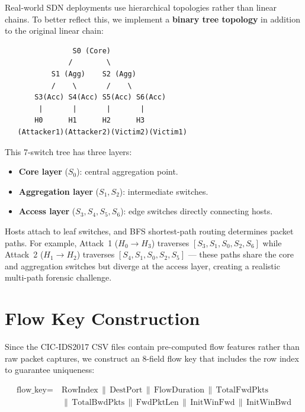 \documentclass[12pt, a4paper]{report}
\begin{document}
Real-world SDN deployments use hierarchical topologies rather than linear
chains. To better reflect this, we implement a \textbf{binary tree
topology} in addition to the original linear chain:

\begin{verbatim}
                S0 (Core)
               /        \
           S1 (Agg)    S2 (Agg)
           /    \       /    \
       S3(Acc) S4(Acc) S5(Acc) S6(Acc)
        |       |       |       |
       H0      H1      H2      H3
   (Attacker1)(Attacker2)(Victim2)(Victim1)
\end{verbatim}

This 7-switch tree has three layers:
\begin{itemize}[leftmargin=*]
  \item \textbf{Core layer} ($S_0$): central aggregation point.
  \item \textbf{Aggregation layer} ($S_1, S_2$): intermediate switches.
  \item \textbf{Access layer} ($S_3, S_4, S_5, S_6$): edge switches
  directly connecting hosts.
\end{itemize}

Hosts attach to leaf switches, and BFS shortest-path routing determines
packet paths. For example, Attack~1 ($H_0 \to H_3$) traverses
$[S_3, S_1, S_0, S_2, S_6]$ while Attack~2 ($H_1 \to H_2$) traverses
$[S_4, S_1, S_0, S_2, S_5]$ --- these paths share the core and
aggregation switches but diverge at the access layer, creating a realistic
multi-path forensic challenge.


\section{Flow Key Construction}


Since the CIC-IDS2017 CSV files contain pre-computed flow features rather
than raw packet captures, we construct an 8-field flow key that includes
the row index to guarantee uniqueness:

\begin{equation}
\begin{split}
  \text{flow\_key} =\ & \text{RowIndex} \,\|\, \text{DestPort} \,\|\,
  \text{FlowDuration} \,\|\, \text{TotalFwdPkts} \\
  &\|\, \text{TotalBwdPkts} \,\|\, \text{FwdPktLen} \,\|\,
  \text{InitWinFwd} \,\|\, \text{InitWinBwd}
\end{split}
\end{equation}
\end{document}
